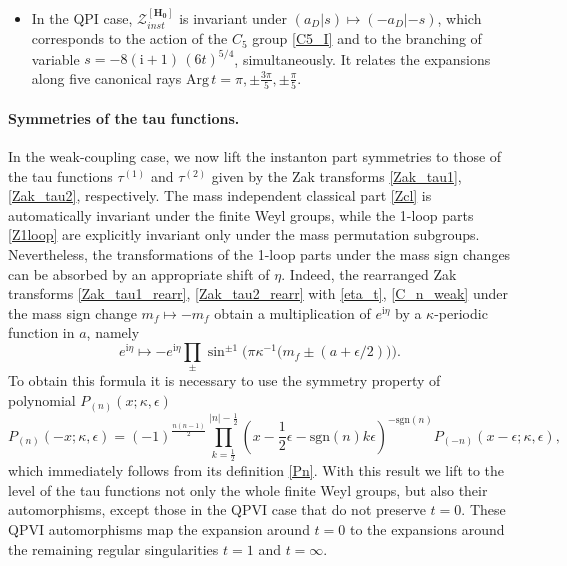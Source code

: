 \documentclass[12pt,a4paper]{article}
\numberwithin{equation}{section}
\newcommand{\ri}{\mathrm{i}}
\newcommand{\D}{\scriptscriptstyle{D}}
\begin{document}
\begin{itemize}
   \item In the QPI case, $\mathcal{Z}_{inst}^{[\mathbf{H_{0}}]}$ \cite[(4.135)]{BST25} is invariant under $(a_{\D}|s)\mapsto (-a_{\D}|-s)$, which corresponds to the action of the $C_5$ group \eqref{C5_I} and to the branching of variable $s=-8(\ri{+}1)\, (6t)^{5/4}$, simultaneously. It relates the expansions along five canonical rays $\mathrm{Arg}\, t=\pi, \pm\frac{3\pi}5, \pm\frac{\pi}5$.
\end{itemize}

\paragraph{Symmetries of the tau functions.}
In the weak-coupling case, we now lift the instanton part symmetries to those of the tau functions $\tau^{(1)}$ and $\tau^{(2)}$ given by the Zak transforms \eqref{Zak_tau1}, \eqref{Zak_tau2}, respectively. The mass independent classical part \eqref{Zcl} is automatically invariant under the finite Weyl groups, while the 1-loop parts \eqref{Z1loop} are explicitly invariant only under the mass permutation subgroups. Nevertheless, the transformations of the 1-loop parts under the mass sign changes can be absorbed by an appropriate shift of $\eta$. Indeed, the rearranged Zak transforms \eqref{Zak_tau1_rearr}, \eqref{Zak_tau2_rearr} with \eqref{eta_t}, \eqref{C_n_weak} under the mass sign change $m_f\mapsto -m_f$ obtain a multiplication of $e^{\ri\eta}$ by a $\kappa$-periodic function in $a$, namely
\begin{equation}
e^{\ri\eta}\mapsto -e^{\ri\eta}\prod_{\pm}\sin^{\pm1}\Big(\pi\kappa^{-1}\big(m_f\pm(a{+}\epsilon/2)\big)\Big).     
\end{equation}
To obtain this formula it is necessary to use the symmetry property of polynomial $P_{(n)}(x;\kappa,\epsilon)$ 
\begin{equation}
P_{(n)}(-x;\kappa,\epsilon)=(-1)^{\frac{n(n{-}1)}2}\prod_{k=\frac12}^{|n|-\frac12}\left(x-\frac12\epsilon-\mathrm{sgn}(n)k\epsilon\right)^{-\mathrm{sgn}(n)} P_{(-n)}(x-\epsilon;\kappa,\epsilon),  
\end{equation}
which immediately follows from its definition \eqref{Pn}. 
With this result we lift to the level of the tau functions not only the whole finite Weyl groups, but also their automorphisms, except those in the QPVI case that do not preserve $t=0$. These QPVI automorphisms map the expansion around $t=0$ to  the expansions around the remaining regular singularities $t=1$ and $t=\infty$. 
\end{document}
